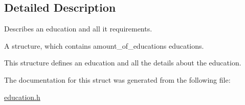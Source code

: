 \subsection{Detailed Description}
Describes an education and all it requirements. 

A structure, which contains amount\+\_\+of\+\_\+educations educations.

This structure defines an education and all the details about the education. 

The documentation for this struct was generated from the following file\+:\begin{DoxyCompactItemize}
\item 
\hyperlink{education_8h}{education.\+h}\end{DoxyCompactItemize}
